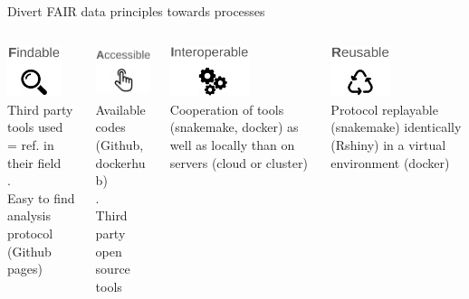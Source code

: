 \begin{frame}{Divert FAIR data principles towards processes}
\begin{columns}[t]
  \begin{column}{.25\textwidth}
      \begin{center}
      \includegraphics[height=1.5cm]{01_introduction/images/logo-FAIR-F.png}\\Third party tools used = ref. in their field\\.\\Easy to find analysis protocol (Github pages)
      \end{center}
  \end{column}
  \begin{column}{.25\textwidth}
      \begin{center}
      \includegraphics[height=1.5cm]{01_introduction/images/logo-FAIR-A.png}\\Available codes (Github, dockerhub)\\.\\Third party open source tools
      \end{center}
  \end{column}
  \begin{column}{.25\textwidth}
     \begin{center}
     \includegraphics[height=1.5cm]{01_introduction/images/logo-FAIR-I.png}\\Cooperation of tools (snakemake, docker) as well as locally than on servers (cloud or cluster)
     \end{center}
  \end{column}
  \begin{column}{.25\textwidth}
     \begin{center}
     \includegraphics[height=1.5cm]{01_introduction/images/logo-FAIR-R.png}\\Protocol replayable (snakemake) identically (Rshiny) in a virtual environment (docker)
     \end{center}
  \end{column}
\end{columns}
\end{frame}
